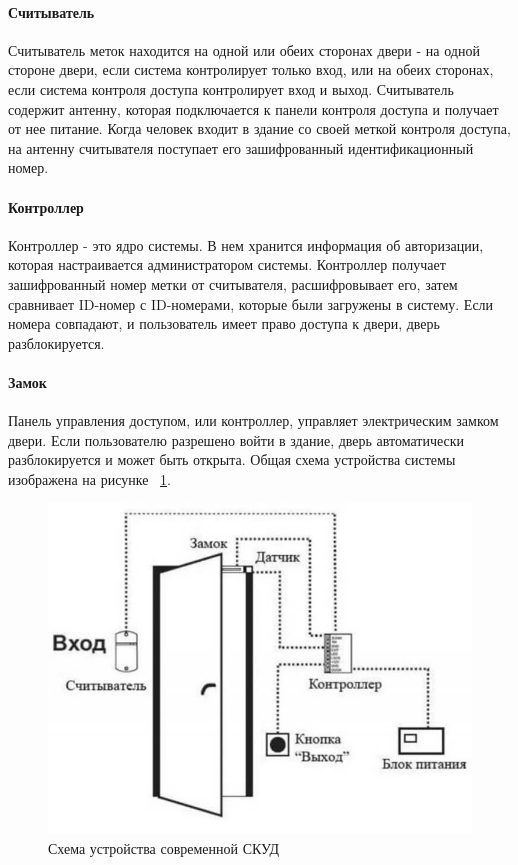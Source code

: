 \paragraph {Считыватель}

Считыватель меток находится на одной или обеих сторонах двери - на одной стороне двери, если система контролирует только вход, или на обеих сторонах, если система контроля доступа контролирует вход и выход. Считыватель содержит антенну, которая подключается к панели контроля доступа и получает от нее питание.
Когда человек входит в здание со своей меткой контроля доступа, на антенну считывателя поступает его зашифрованный идентификационный номер.

\paragraph {Контроллер}

Контроллер - это ядро системы. В нем хранится информация об авторизации, которая настраивается администратором системы. Контроллер получает зашифрованный номер метки от считывателя, расшифровывает его, затем сравнивает ID-номер с ID-номерами, которые были загружены в систему. Если номера совпадают, и пользователь имеет право доступа к двери, дверь разблокируется.

\paragraph {Замок}

Панель управления доступом, или контроллер, управляет электрическим замком двери. Если пользователю разрешено войти в здание, дверь автоматически разблокируется и может быть открыта.
Общая схема устройства системы изображена на рисунке ~\ref{fig:commonscheme1}.
\begin{figure}
	\centering
	\includegraphics[width=0.8\linewidth]{images/CommonScheme1}
	\caption{Схема устройства современной СКУД}
	\label{fig:commonscheme1}
\end{figure}

